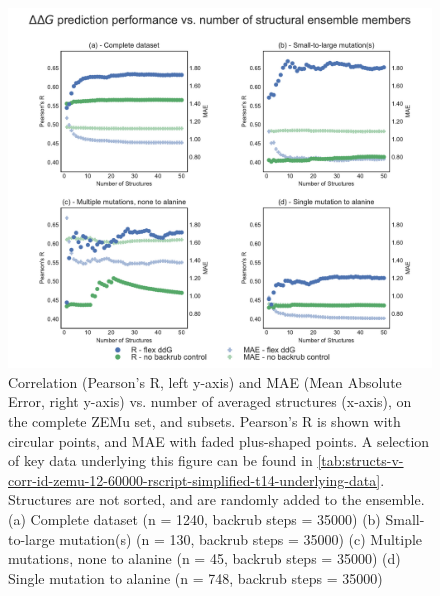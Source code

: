 \begin{figure}
  \includegraphics[width=\textwidth,keepaspectratio]{structs-v-corr-id-zemu-12-60000-rscript-simplified-t14.pdf}
  \caption[]{ %
    Correlation (Pearson's R, left y-axis) and MAE (Mean Absolute Error, right y-axis) vs. number of averaged structures (x-axis), on the complete ZEMu set, and subsets.
    Pearson's R is shown with circular points, and MAE with faded plus-shaped points.
    A selection of key data underlying this figure can be found in \cref{tab:structs-v-corr-id-zemu-12-60000-rscript-simplified-t14-underlying-data}.
    Structures are not sorted, and are randomly added to the ensemble. 
    (a) Complete dataset (n = 1240, backrub steps = 35000)
    (b) Small-to-large mutation(s) (n = 130, backrub steps = 35000)
    (c) Multiple mutations, none to alanine (n = 45, backrub steps = 35000)
    (d) Single mutation to alanine (n = 748, backrub steps = 35000)
  } \label{fig:structs-v-corr-id-zemu-12-60000-rscript-simplified-t14}
\end{figure}
